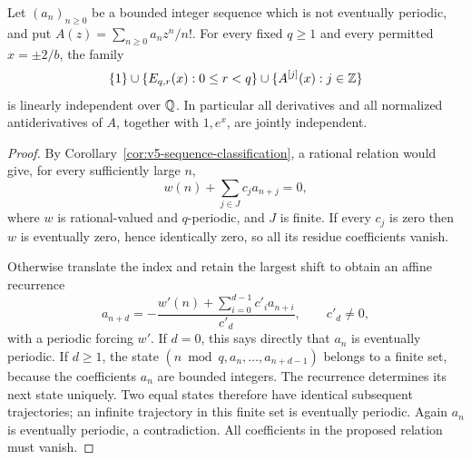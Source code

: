 \begin{theorem}
\label{thm:v5-aperiodic-hierarchy}
Let $(a_n)_{n\geq0}$ be a bounded integer sequence which is not eventually
periodic, and put $A(z)=\sum_{n\geq0}a_nz^n/n!$.
For every fixed $q\geq1$ and every permitted $x=\pm2/b$, the family
\[
 \{1\}\cup\{E_{q,r}(x):0\leq r<q\}
 \cup\{A^{[j]}(x):j\in\mathbb Z\}
\]
is linearly independent over $\mathbb Q$.
In particular all derivatives and all normalized antiderivatives of
$A$, together with $1,e^x$, are jointly independent.
\end{theorem}
\begin{proof}
By Corollary~\ref{cor:v5-sequence-classification}, a rational relation
would give, for every sufficiently large $n$,
\[
 w(n)+\sum_{j\in J}c_j a_{n+j}=0,
\]
where $w$ is rational-valued and $q$-periodic, and $J$ is finite.
If every $c_j$ is zero then $w$ is eventually zero, hence identically
zero, so all its residue coefficients vanish.

Otherwise translate the index and retain the largest shift to obtain
an affine recurrence
\[
 a_{n+d}=-\frac{w'(n)+\sum_{i=0}^{d-1}c'_i a_{n+i}}{c'_d},
 \qquad c'_d\ne0,
\]
with a periodic forcing $w'$.  If $d=0$, this says directly that $a_n$
is eventually periodic.  If $d\geq1$, the state
$(n\bmod q,a_n,\ldots,a_{n+d-1})$ belongs to a finite set, because
the coefficients $a_n$ are bounded integers.  The recurrence determines
its next state uniquely.  Two equal states therefore have identical
subsequent trajectories; an infinite trajectory in this finite set
is eventually periodic.  Again $a_n$ is eventually periodic, a
contradiction.  All coefficients in the proposed relation must vanish.
\end{proof}

